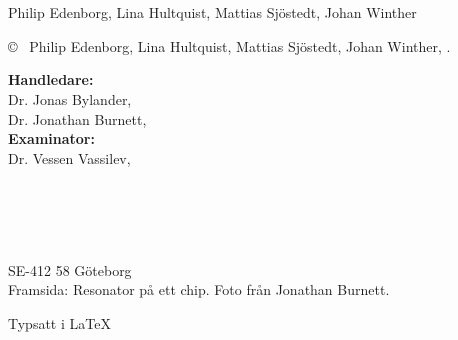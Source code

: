 \documentclass[../../main.tex]{subfiles}
\begin{document}
\newpage
\thispagestyle{plain}
\vspace*{4.5cm}
\titel\\
\undertitel\\
\newline
Philip Edenborg, Lina Hultquist, Mattias Sjöstedt, Johan Winther \setlength{\parskip}{1cm}

\copyright ~ Philip Edenborg, Lina Hultquist, Mattias Sjöstedt, Johan Winther, \the\year. \setlength{\parskip}{1cm}

\textbf{Handledare:}\\
Dr. Jonas Bylander, \department\\
Dr. Jonathan Burnett, \department\\
\textbf{Examinator:}\\
Dr. Vessen Vassilev, \department\setlength{\parskip}{1cm}

\reportnr\\	%
\department\\
\division\\
\university\\
SE-412 58 Göteborg\\

\vfill
Framsida: Resonator på ett chip. Foto från Jonathan Burnett. \setlength{\parskip}{0.5cm}

Typsatt i \LaTeX \\
\adress
\end{document}
